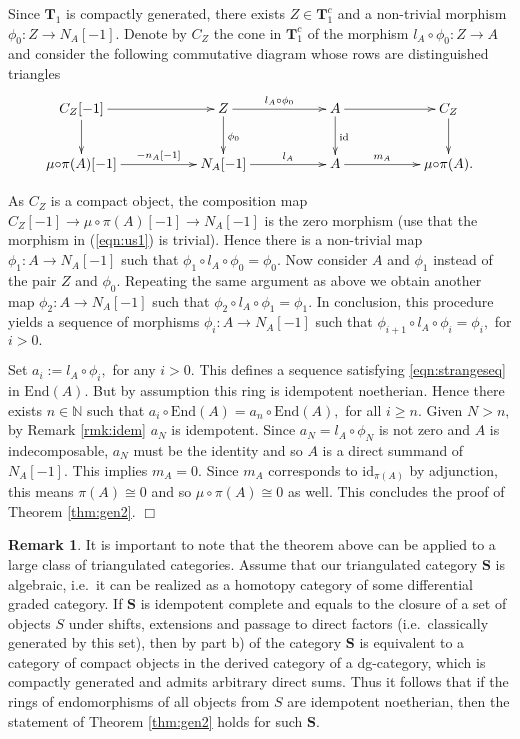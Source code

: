 \documentclass[a4paper,11pt,twoside]{amsart}
\numberwithin{equation}{section}
\theoremstyle{definition}
\newtheorem{remark}[thm]{Remark}
\begin{document}
Since ${{\mathbf{{T}}}}_1$ is compactly generated, there exists
$Z\in{{\mathbf{{T}}}}_1^c$ and a non-trivial morphism $\phi_0\colon Z\to{{N_A}[-1]}.$
Denote by $C_Z$ the cone in ${{\mathbf{{T}}}}_1^c$ of the morphism
$l_A{\circ}\phi_0\colon Z\to A$ and consider the following commutative
diagram whose rows are distinguished triangles
\[
\xymatrix{
{{C_Z}[-1]} \ar[d]\ar[rr] && Z \ar[d]^{\phi_0}\ar[rr]^-{l_A{\circ}\phi_0}  && A\ar[d]^{\mathrm{id}}\ar[rr]&& C_Z \ar[d]\\
{{\mu{\circ}\pi(A)}[-1]} \ar[rr]^-{{{-n_A}[-1]}} && {{N_A}[-1]}\ar[rr]^-{l_A} && A\ar[rr]^-{m_A} && \mu{\circ}\pi(A).
}
\]

As $C_Z$ is a compact object, the composition map
${{C_Z}[-1]}\to{{\mu{\circ}\pi(A)}[-1]}\to{{N_A}[-1]}$ is the zero morphism
(use that the morphism in (\ref{eqn:us1}) is trivial).  Hence there is a
non-trivial map $\phi_1\colon A\to{{N_A}[-1]}$ such that $\phi_1{\circ}
l_A{\circ}\phi_0=\phi_0.$ Now consider $A$ and $\phi_1$ instead of the
pair $Z$ and $\phi_0.$ Repeating the same argument as above we obtain
another map $\phi_2\colon A\to{{N_A}[-1]}$ such that $\phi_2{\circ}
l_A{\circ}\phi_1=\phi_1.$ In conclusion, this procedure yields a
sequence of morphisms $\phi_i\colon A\to{{N_A}[-1]}$ such that
$\phi_{i+1}{\circ} l_A{\circ}\phi_i=\phi_i,$ for $i>0.$

Set $a_i:=l_A{\circ}\phi_i,$ for any $i>0.$ This defines a sequence satisfying \eqref{eqn:strangeseq} in
${\mathrm{End}}(A).$ But by
assumption this ring is idempotent noetherian. Hence there exists
$n\in{\mathbb{N}}$ such that $a_i{\circ}{\mathrm{End}}(A)=a_n{\circ}{\mathrm{End}}(A),$ for all $i\geq n.$ Given $N>n,$ by
Remark \ref{rmk:idem} $a_N$ is idempotent. Since
$a_N=l_A{\circ}\phi_N$ is not zero and $A$ is indecomposable, $a_N$ must be the identity and so $A$ is a direct summand of ${{N_A}[-1]}.$ This implies $m_A=0.$ Since $m_A$ corresponds to ${\mathrm{id}}_{\pi(A)}$ by adjunction, this means $\pi(A){\cong} 0$ and so $\mu{\circ}\pi(A){\cong} 0$ as well. This concludes the proof of Theorem \ref{thm:gen2}. \hfill $\Box$

\begin{remark}\label{rmk:keller}
It is important to note that the theorem above can be applied to a large class of triangulated categories.
Assume that our triangulated category ${{\mathbf{{S}}}}$ is algebraic, i.e.\ it can be realized as a homotopy category of some differential graded category.
If ${{\mathbf{{S}}}}$ is idempotent complete and equals to the closure of  a set of objects $S$ under shifts, extensions
and passage to direct factors (i.e.\ classically generated by this set),
then by part b) of \cite[Thm.\ 3.8]{K} the category ${{\mathbf{{S}}}}$ is equivalent to a category of compact objects in the derived category of a dg-category, which is compactly generated and admits arbitrary direct sums.
Thus it follows that if the rings of endomorphisms of all objects from $S$ are idempotent noetherian,
then the statement of Theorem \ref{thm:gen2} holds for such ${{\mathbf{{S}}}}.$
\end{remark}
\end{document}
